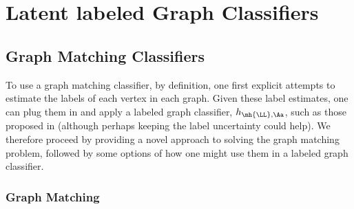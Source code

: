 \documentclass[10pt,journal,cspaper,compsoc]{IEEEtran}
\begin{document}
% 
% 




\section{Latent labeled Graph Classifiers} %
\label{sec:algorithms}

\subsection{Graph Matching Classifiers} %
\label{sec:quadratic_assignment_problem}

To use a graph matching classifier, by definition, one first explicit attempts to estimate the labels of each vertex in each graph.  Given these label estimates, one can plug them in and apply a labeled graph classifier, $h_{\mh{\LL},\Aa}$, such as those proposed in \cite{Vogelstein2011} (although perhaps keeping the label uncertainty could help).  We therefore proceed by providing a novel approach to solving the graph matching problem, followed by some options of how one might use them in a labeled graph classifier.

\subsubsection{Graph Matching} %
\label{ssub:graph_matching}
\end{document}
